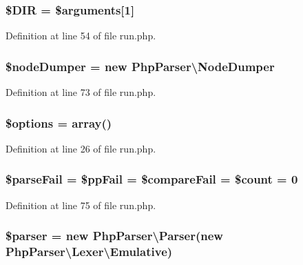 \subsubsection[{\$\+D\+I\+R}]{\setlength{\rightskip}{0pt plus 5cm}\$D\+I\+R = \$arguments[1]}\label{run_8php_a527ec11d8ff094eca80076d5c80de767}


Definition at line 54 of file run.\+php.

\subsubsection[{\$node\+Dumper}]{\setlength{\rightskip}{0pt plus 5cm}\$node\+Dumper = new {\bf Php\+Parser\textbackslash{}\+Node\+Dumper}}\label{run_8php_ae7bbf878e12fdc79fad78ca63524025e}


Definition at line 73 of file run.\+php.

\subsubsection[{\$options}]{\setlength{\rightskip}{0pt plus 5cm}\${\bf options} = array()}\label{run_8php_a011800c63ece4cbbfa77136a20607023}


Definition at line 26 of file run.\+php.

\subsubsection[{\$parse\+Fail}]{\setlength{\rightskip}{0pt plus 5cm}\$parse\+Fail = \$pp\+Fail = \$compare\+Fail = \$count = 0}\label{run_8php_ae6c7c560ab2fb99e7b0fa3fccee1f42d}


Definition at line 75 of file run.\+php.

\subsubsection[{\$parser}]{\setlength{\rightskip}{0pt plus 5cm}\$parser = new {\bf Php\+Parser\textbackslash{}\+Parser}(new {\bf Php\+Parser\textbackslash{}\+Lexer\textbackslash{}\+Emulative})}\label{run_8php_a147a766daa03d52576c7345fea31c945}


